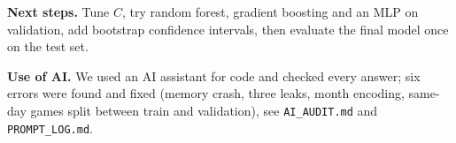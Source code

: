 \documentclass[11pt,a4paper]{article}
\newcommand{\code}[1]{\texttt{#1}}
\begin{document}
\textbf{Next steps.} Tune $C$, try random forest, gradient boosting and an MLP on validation, add bootstrap confidence intervals,
then evaluate the final model once on the test set.

\textbf{Use of AI.} We used an AI assistant for code and checked every answer; six errors were found and fixed
(memory crash, three leaks, month encoding, same-day games split between train and validation), see \code{AI\_AUDIT.md} and \code{PROMPT\_LOG.md}.
\end{document}
